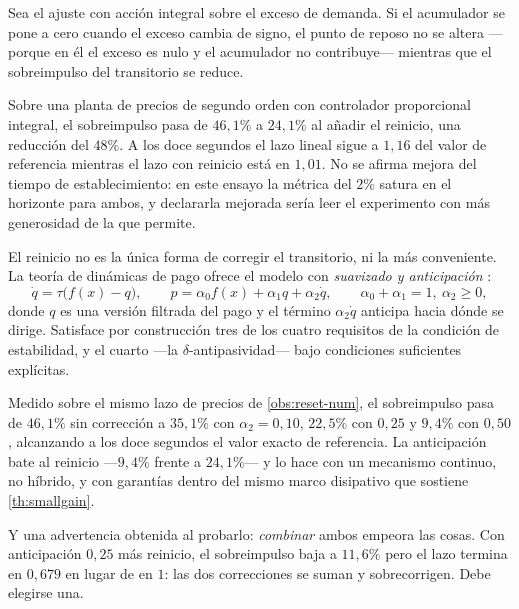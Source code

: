 \begin{proposicion}
\label{pr:reset}
Sea el ajuste con acción integral sobre el exceso de demanda. Si el acumulador
se pone a cero cuando el exceso cambia de signo, el punto de reposo no se altera
—porque en él el exceso es nulo y el acumulador no contribuye— mientras que el
sobreimpulso del transitorio se reduce.
\end{proposicion}

\begin{observacion}
\label{obs:reset-num}
Sobre una planta de precios de segundo orden con controlador proporcional
integral, el sobreimpulso pasa de $46{,}1\%$ a $24{,}1\%$ al añadir el reinicio,
una reducción del $48\%$. A los doce segundos el lazo lineal sigue a $1{,}16$
del valor de referencia mientras el lazo con reinicio está en $1{,}01$. No se
afirma mejora del tiempo de establecimiento: en este ensayo la métrica del $2\%$
satura en el horizonte para ambos, y declararla mejorada sería leer el
experimento con más generosidad de la que permite.
\end{observacion}

\begin{observacion}
\label{obs:anticipacion}
El reinicio no es la única forma de corregir el transitorio, ni la más
conveniente. La teoría de dinámicas de pago ofrece el modelo con
\emph{suavizado y anticipación} \cite{martinezPiazuelo2025gne}:
\[
  \dot q=\tau\bigl(f(x)-q\bigr),
  \qquad
  p=\alpha_0 f(x)+\alpha_1 q+\alpha_2\dot q,
  \qquad \alpha_0+\alpha_1=1,\ \alpha_2\ge0,
\]
donde $q$ es una versión filtrada del pago y el término $\alpha_2\dot q$ anticipa
hacia dónde se dirige. Satisface por construcción tres de los cuatro requisitos
de la condición de estabilidad, y el cuarto —la $\delta$-antipasividad— bajo
condiciones suficientes explícitas.

Medido sobre el mismo lazo de precios de \cref{obs:reset-num}, el sobreimpulso
pasa de $46{,}1\%$ sin corrección a $35{,}1\%$ con $\alpha_2=0{,}10$,
$22{,}5\%$ con $0{,}25$ y $9{,}4\%$ con $0{,}50$, alcanzando a los doce segundos
el valor exacto de referencia. La anticipación bate al reinicio —$9{,}4\%$ frente
a $24{,}1\%$— y lo hace con un mecanismo continuo, no híbrido, y con garantías
dentro del mismo marco disipativo que sostiene \cref{th:smallgain}.

Y una advertencia obtenida al probarlo: \emph{combinar} ambos empeora las cosas.
Con anticipación $0{,}25$ más reinicio, el sobreimpulso baja a $11{,}6\%$ pero el
lazo termina en $0{,}679$ en lugar de en $1$: las dos correcciones se suman y
sobrecorrigen. Debe elegirse una.
\end{observacion}

